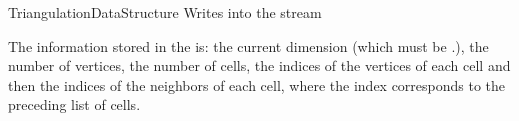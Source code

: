 \begin{ccRefConcept}{TriangulationDataStructure}
{Writes  into the stream }

The information stored in the  is: the current dimension (which
must be \ccc{<=} \ccVar.), the number of vertices,
the number of cells, the indices of the vertices of each cell and then the
indices of the neighbors of each cell, where the index corresponds to the
preceding list of cells.


\ccSeeAlso

\\

\end{ccRefConcept}
